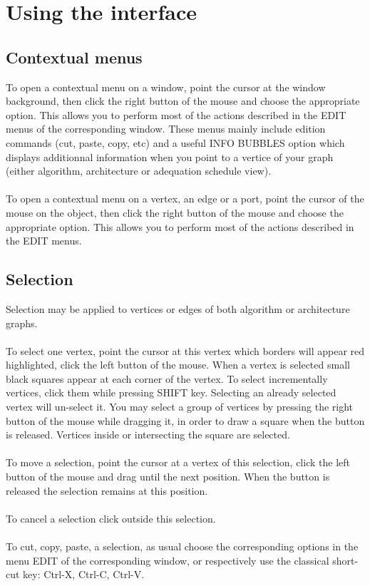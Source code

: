 \documentclass[11pt,twoside]{report}
\begin{document}
\chapter{Using the interface}
\section{Contextual menus}
To open a contextual menu on a window, point the cursor at the window
background, then click the right button of the mouse and choose the
appropriate option. This allows you to perform most of the actions
described in the EDIT menus of the corresponding window. These menus
mainly include edition commands (cut, paste, copy, etc) and a useful
INFO BUBBLES option which displays additionnal information when you
point to a vertice of your graph (either algorithm, architecture or
adequation schedule view).\\\\
To open a contextual menu on a vertex, an edge or a port, point the
cursor of the mouse on the object, then click the right button of the
mouse and choose the appropriate option. This allows you to perform
most of the actions described in the EDIT menus.


\section{Selection}
Selection may be applied to vertices or edges of both algorithm or architecture graphs.\\\\
To select one vertex, point the cursor at this vertex which borders
will appear red highlighted, click the left button of the mouse. When
a vertex is selected small black squares appear at each corner of the
vertex. To select incrementally vertices, click them while pressing
SHIFT key. Selecting an already selected vertex will un-select it. You
may select a group of vertices by pressing the right button of the
mouse while dragging it, in order to draw a square when the button is
released. Vertices inside or intersecting the square are selected.\\\\
To move a selection, point the cursor at a vertex of this selection,
click the left button of the mouse and drag until the next
position. When the button is released the selection remains at this
position.\\\\
To cancel a selection click outside this selection.\\\\
To cut, copy, paste, a selection, as usual choose the corresponding
options in the menu EDIT of the corresponding window, or respectively
use the classical short-cut key: Ctrl-X, Ctrl-C, Ctrl-V.
\end{document}
